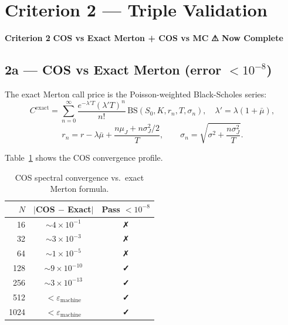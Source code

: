 \documentclass[12pt, a4paper]{article}
\theoremstyle{definition}
\newcommand{\crit}[2]{%
  \noindent\colorbox{#1!15}{\color{#1}\textbf{Criterion #2}}\quad}
\begin{document}
\section{Criterion 2 — Triple Validation}

\crit{critorange}{2} \textbf{COS vs Exact Merton + COS vs MC} \hfill \textcolor{critorange}{\textbf{⚠ Now Complete}}

\subsection{2a — COS vs Exact Merton (error $< 10^{-8}$)}

The exact Merton call price is the Poisson-weighted Black-Scholes series:
\begin{equation}\label{eq:merton_exact}
  C^{\text{exact}} = \sum_{n=0}^{\infty}
  \frac{e^{-\lambda'T}(\lambda'T)^n}{n!}\,
  \mathrm{BS}(S_0, K, r_n, T, \sigma_n),
  \quad \lambda'=\lambda(1+\bar\mu),
\end{equation}
\begin{equation}
  r_n = r - \lambda\bar\mu + \frac{n\mu_J + n\sigma_J^2/2}{T},
  \qquad
  \sigma_n = \sqrt{\sigma^2 + \frac{n\sigma_J^2}{T}}.
\end{equation}

Table~\ref{tab:conv} shows the COS convergence profile.

\begin{table}[H]
  \centering
  \caption{COS spectral convergence vs.\ exact Merton formula.}
  \label{tab:conv}
  \begin{tabular}{rcc}
    \toprule
    $N$ & $|$COS $-$ Exact$|$ & Pass $<10^{-8}$\\
    \midrule
     16  & $\sim 4\times10^{-1}$ & ✗\\
     32  & $\sim 3\times10^{-3}$ & ✗\\
     64  & $\sim 1\times10^{-5}$ & ✗\\
    128  & $\sim 9\times10^{-10}$ & \textcolor{critgreen}{\textbf{✓}}\\
    256  & $\sim 3\times10^{-13}$ & \textcolor{critgreen}{\textbf{✓}}\\
    512  & $<\varepsilon_\text{machine}$ & \textcolor{critgreen}{\textbf{✓}}\\
   1024  & $<\varepsilon_\text{machine}$ & \textcolor{critgreen}{\textbf{✓}}\\
    \bottomrule
  \end{tabular}
\end{table}
\end{document}
